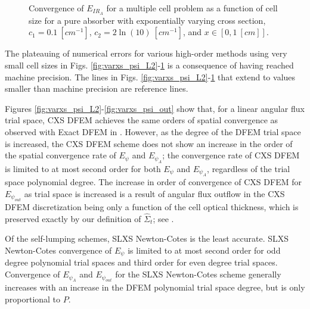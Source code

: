 \begin{figure}[!htp]
\begin{center}
{}
\end{center}
\caption{Convergence of $E_{IR_A}$ for a multiple cell problem as a function of cell size for a pure absorber with exponentially varying cross section, $c_1 = 0.1~[cm^{-1}]$, $c_2 = 2\ln(10)~[cm^{-1}]$, and $x\in \left[0,1~[cm] \right]$.}
\label{fig:varxs_I_A}
\end{figure}
The plateauing of numerical errors for various high-order methods using very small cell sizes in Figs. \ref{fig:varxs_psi_L2}-\ref{fig:varxs_I_A} is a consequence of having  reached machine precision.
The lines in Figs. \ref{fig:varxs_psi_L2}-\ref{fig:varxs_I_A} that extend to values smaller than machine precision are reference lines.

Figures \ref{fig:varxs_psi_L2}-\ref{fig:varxs_psi_out} show that, for a linear angular flux trial space, CXS DFEM achieves the same orders of spatial convergence as observed with Exact DFEM in \cite{part_1_paper}.
However, as the degree of the DFEM trial space is increased, the CXS DFEM scheme does not show an increase in the order of the spatial convergence rate of  $E_{\psi}$ and $E_{\psi_A}$; the convergence rate of CXS DFEM is limited to at most second order for both $E_{\psi}$ and $E_{\psi_A}$, regardless of the trial space polynomial degree.  
The increase in order of convergence of CXS DFEM for $E_{\psi_{out}}$ as trial space is increased is a result of angular flux outflow in the
CXS DFEM discretization being only a function of the cell optical thickness, which is preserved exactly by our definition of $\hat{\Sigma}_t$; see .

Of the self-lumping schemes, SLXS Newton-Cotes is the least accurate.  SLXS Newton-Cotes convergence of $E_{\psi}$ is limited to at most second order for odd degree polynomial trial spaces and third order for even degree trial spaces.  
Convergence of $E_{\psi_A}$ and $E_{\psi_{out}}$ for the SLXS Newton-Cotes scheme generally increases with an increase in the DFEM polynomial trial space degree, but is only proportional to $P$.


